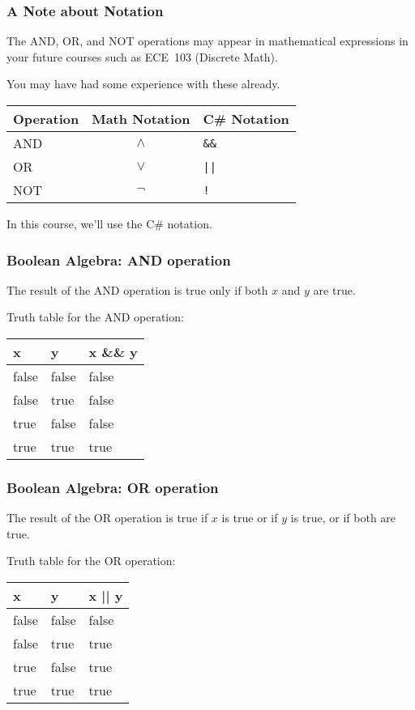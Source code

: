 \begin{frame}
\frametitle{A Note about Notation}

The AND, OR, and NOT operations may appear in mathematical expressions in your future courses such as ECE~103 (Discrete Math).

You may have had some experience with these already. 

\begin{center}
\begin{tabular}{l|c|l}
	\textbf{Operation} & \textbf{Math Notation} & \textbf{C\# Notation} \\ \hline
	AND & $\wedge$ & \texttt{\&\&} \\ \hline
	OR  & $\vee$ & \texttt{||} \\ \hline
	NOT & $\neg$ & \texttt{!} \\
\end{tabular}
\end{center}

In this course, we'll use the C\# notation. 

\end{frame}


\begin{frame}
\frametitle{Boolean Algebra: AND operation}

The result of the AND operation is true only if both $x$ and $y$ are true.

Truth table for the AND operation:

\begin{center}
\begin{tabular}{l|l|l}
	\textbf{x} & \textbf{y} & \textbf{x \&\& y}\\ \hline
	false & false & false \\ \hline
	false & true & false \\ \hline
	true & false & false \\ \hline
	true & true & true \\ 
\end{tabular}
\end{center}

\end{frame}

\begin{frame}
\frametitle{Boolean Algebra: OR operation}


The result of the OR operation is true if $x$ is true or if $y$ is true, or if both are true.

Truth table for the OR operation:

\begin{center}
\begin{tabular}{l|l|l}
	\textbf{x} & \textbf{y} & \textbf{x || y}\\ \hline
	false & false & false \\ \hline
	false & true & true \\ \hline
	true & false & true \\ \hline
	true & true & true \\ 
\end{tabular}
\end{center}

\end{frame}


